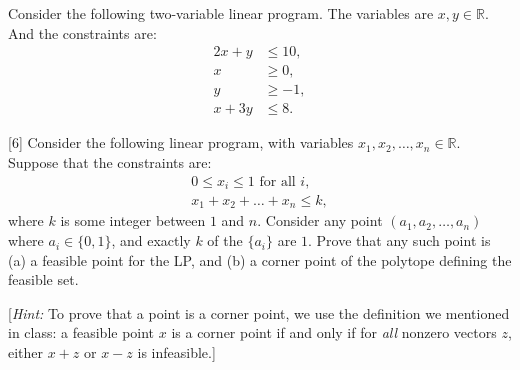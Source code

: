 \documentclass[addpoints, 11pt]{exam}
\begin{document}
\begin{questions}
[{\em Hint:} consider a feasible solution to the optimization problem and focus on the edges with $x_{uv}=1$. Do they have to form a {\em single} cycle?]

Consider the following two-variable linear program. The variables are $x, y \in \mathbb{R}$. And the constraints are:
\begin{align*}
2x + y & \le 10, \\
x &\ge 0, \\
y &\ge -1, \\
x+3y &\le 8.
\end{align*}

[6]
Consider the following linear program, with variables $x_1, x_2, \dots, x_n \in \mathbb{R}$. Suppose that the constraints are:
\begin{align*}
0 \le x_i \le 1 \text{ for all $i$}, \\
x_1 + x_2 + \dots + x_n \le k,
\end{align*}
where $k$ is some integer between $1$ and $n$. Consider any point $(a_1, a_2, \dots, a_n)$ where $a_i \in \{0,1\}$, and exactly $k$ of the $\{a_i\}$ are $1$. Prove that any such point is (a) a feasible point for the LP, and (b) a corner point of the polytope defining the feasible set. 

[{\em Hint:} To prove that a point is a corner point, we use the definition we mentioned in class: a feasible point $x$ is a corner point if and only if for {\em all} nonzero vectors $z$, either $x + z$ or $x-z$ is infeasible.]


\end{questions}
\end{document}
